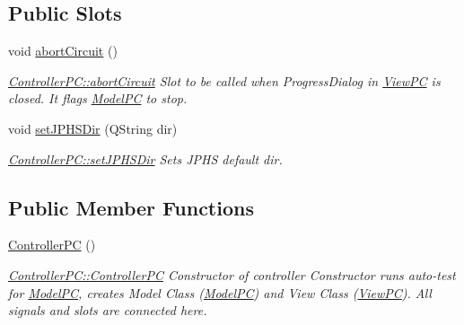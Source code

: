 \subsection*{Public Slots}
\begin{DoxyCompactItemize}
\item 
void \hyperlink{class_controller_p_c_a8814989f7be1214e06b2e720889066b0}{abort\+Circuit} ()
\begin{DoxyCompactList}\small\item\em \hyperlink{class_controller_p_c_a8814989f7be1214e06b2e720889066b0}{Controller\+P\+C\+::abort\+Circuit} Slot to be called when Progress\+Dialog in \hyperlink{class_view_p_c}{View\+PC} is closed. It flags \hyperlink{class_model_p_c}{Model\+PC} to stop. \end{DoxyCompactList}\item 
void \hyperlink{class_controller_p_c_ac00d29685a7e5b780c01eb438e10f96d}{set\+J\+P\+H\+S\+Dir} (Q\+String dir)
\begin{DoxyCompactList}\small\item\em \hyperlink{class_controller_p_c_ac00d29685a7e5b780c01eb438e10f96d}{Controller\+P\+C\+::set\+J\+P\+H\+S\+Dir} Sets J\+P\+HS default dir. \end{DoxyCompactList}\end{DoxyCompactItemize}
\subsection*{Public Member Functions}
\begin{DoxyCompactItemize}
\item 
\hyperlink{class_controller_p_c_afa6c92d67bf3b6531c42385fc5938003}{Controller\+PC} ()
\begin{DoxyCompactList}\small\item\em \hyperlink{class_controller_p_c_afa6c92d67bf3b6531c42385fc5938003}{Controller\+P\+C\+::\+Controller\+PC} Constructor of controller Constructor runs auto-\/test for \hyperlink{class_model_p_c}{Model\+PC}, creates Model Class (\hyperlink{class_model_p_c}{Model\+PC}) and View Class (\hyperlink{class_view_p_c}{View\+PC}). All signals and slots are connected here. \end{DoxyCompactList}\end{DoxyCompactItemize}
